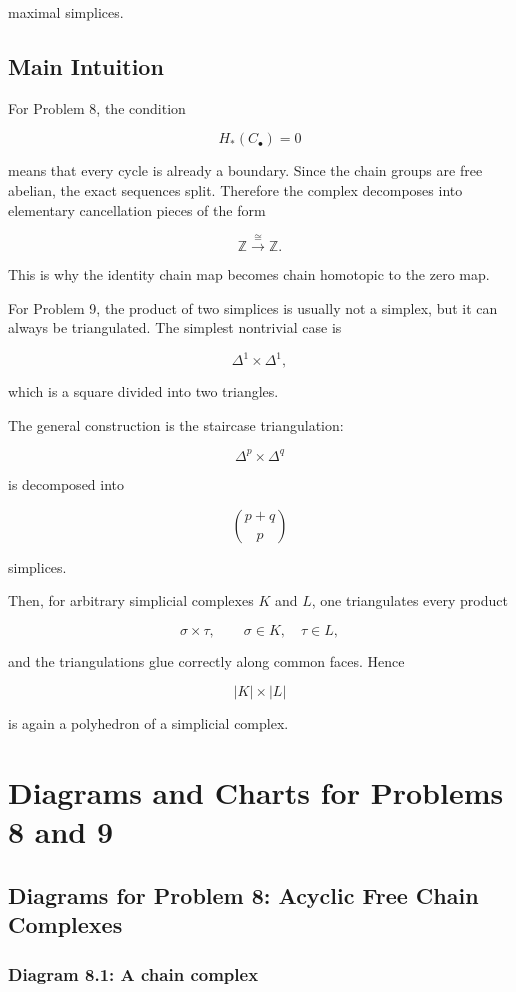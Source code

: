 \documentclass[12pt,a4paper]{article}
\theoremstyle{notespace}
\begin{document}
maximal simplices.

\subsection{Main Intuition}

For Problem 8, the condition

\[
H_*(C_\bullet)=0
\]

means that every cycle is already a boundary. Since the chain groups are free abelian, the exact sequences split. Therefore the complex decomposes into elementary cancellation pieces of the form

\[
\mathbb Z\xrightarrow{\cong}\mathbb Z.
\]

This is why the identity chain map becomes chain homotopic to the zero map.

For Problem 9, the product of two simplices is usually not a simplex, but it can always be triangulated. The simplest nontrivial case is

\[
\Delta^1\times\Delta^1,
\]

which is a square divided into two triangles.

The general construction is the staircase triangulation:

\[
\Delta^p\times\Delta^q
\]

is decomposed into

\[
\binom{p+q}{p}
\]

simplices.

Then, for arbitrary simplicial complexes \(K\) and \(L\), one triangulates every product

\[
\sigma\times \tau,
\qquad
\sigma\in K,
\quad
\tau\in L,
\]

and the triangulations glue correctly along common faces. Hence

\[
|K|\times |L|
\]

is again a polyhedron of a simplicial complex.

\section{Diagrams and Charts for Problems 8 and 9}

\subsection{Diagrams for Problem 8: Acyclic Free Chain Complexes}

\subsubsection{Diagram 8.1: A chain complex}
\end{document}
